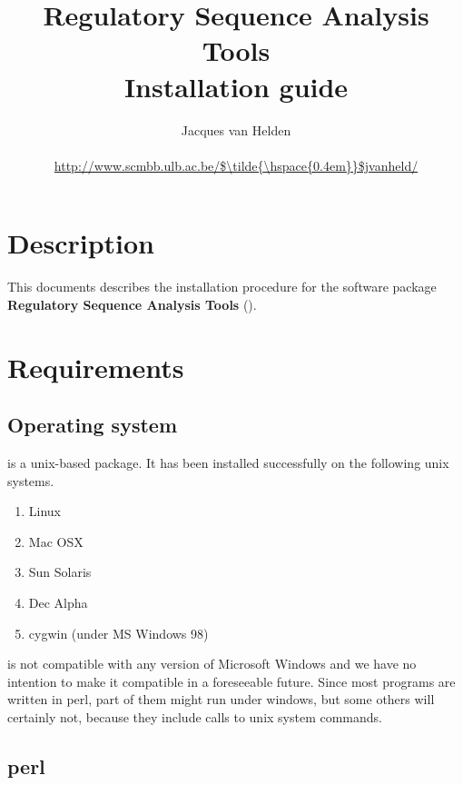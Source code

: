 \documentclass{article}
\begin{document}
\title{Regulatory Sequence Analysis Tools \\
Installation guide}

\author{
	Jacques van Helden \\
	 \\
	\url{http://www.scmbb.ulb.ac.be/$\tilde{\hspace{0.4em}}$jvanheld/} \\
	\scmb 
}


\maketitle

\newpage
\tableofcontents
\newpage

\section{Description}

This documents describes the installation procedure for the software
package \textbf{Regulatory Sequence Analysis Tools} (\RSAT).

\section{Requirements}

\subsection{Operating system}

\RSAT is a unix-based package. It has been installed successfully on
the following unix systems.

\begin{enumerate}
\item Linux
\item Mac OSX
\item Sun Solaris
\item Dec Alpha
\item cygwin (under MS Windows 98)
\end{enumerate}

\RSAT is not compatible with any version of Microsoft Windows and we
have no intention to make it compatible in a foreseeable future. Since
most programs are written in perl, part of them might run under
windows, but some others will certainly not, because they include
calls to unix system commands.

\subsection{perl}
\end{document}
